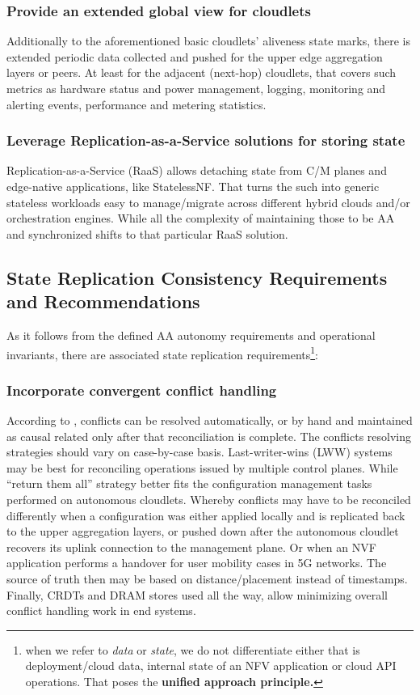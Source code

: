 \documentclass[conference]{IEEEtran}
\begin{document}
\subsubsection{Provide an extended global view for cloudlets}
Additionally to the aforementioned basic cloudlets' aliveness state marks,
there is extended periodic data collected and pushed for the upper edge
aggregation layers or peers. At least for the adjacent (next-hop) cloudlets,
that covers such metrics as hardware status and power management, logging,
monitoring and alerting events, performance and metering statistics.

\subsubsection{Leverage Replication-as-a-Service solutions for storing state}
Replication-as-a-Service (RaaS) allows detaching state from C/M planes and
edge-native applications, like StatelessNF\cite{b16}. That turns the such into
generic stateless workloads easy to manage/migrate across different hybrid
clouds and/or orchestration engines. While all the complexity of maintaining
those to be AA and synchronized shifts to that particular RaaS solution.

\subsection{State Replication Consistency Requirements and Recommendations}
As it follows from the defined AA autonomy requirements and operational
invariants, there are associated state replication requirements\footnote{when
we refer to \textit{data} or \textit{state}, we do not differentiate either
that is deployment/cloud data, internal state of an NFV application or cloud
API operations. That poses the \textbf{unified approach principle.}}:

\subsubsection{Incorporate convergent conflict handling}
According to \cite{b1}, conflicts can be resolved automatically, or by hand and
maintained as causal related only after that reconciliation is complete. The
conflicts resolving strategies should vary on case-by-case basis.
Last-writer-wins (LWW) systems\cite{b1}\cite{b13} may be best for
reconciling operations issued by multiple control planes. While ``return them
all''\cite{b1}\cite{b17} strategy better fits the configuration management tasks
performed on autonomous cloudlets. Whereby conflicts may have to be reconciled
differently when a configuration was either applied locally and is replicated
back to the upper aggregation layers, or pushed down after the autonomous
cloudlet recovers its uplink connection to the management plane. Or when an NVF
application performs a handover for user mobility cases in 5G networks. The
source of truth then may be based on distance/placement instead of timestamps.
Finally, CRDTs and DRAM stores used all the way, allow minimizing overall
conflict handling work in end systems.
\end{document}
